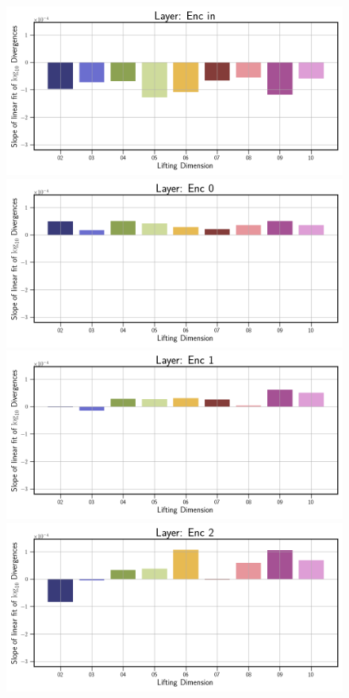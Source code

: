 \begin{figure}[!htbp]
    \centering
    \begin{minipage}{.5\textwidth}
        \includegraphics[width=\textwidth]{"../Figures/van_der_pol_slope_linear_fit_enc_in.png"} 
        \includegraphics[width=\textwidth]{"../Figures/van_der_pol_slope_linear_fit_enc_0.png"} 
        \includegraphics[width=\textwidth]{"../Figures/van_der_pol_slope_linear_fit_enc_1.png"} 
        \includegraphics[width=\textwidth]{"../Figures/van_der_pol_slope_linear_fit_enc_2.png"} 

\end{minipage}
\end{figure}
